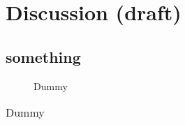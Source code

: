 \chapter{Discussion (draft)}

\section{something}






\begin{figure}[ht]
\caption{Dummy}
\label{fig:dum1}
\end{figure}

\begin{table}[ht]
\caption{Dummy}
\begin{tabular}{|c|c|}
\end{tabular}
\label{tab:dum1}
\end{table}
